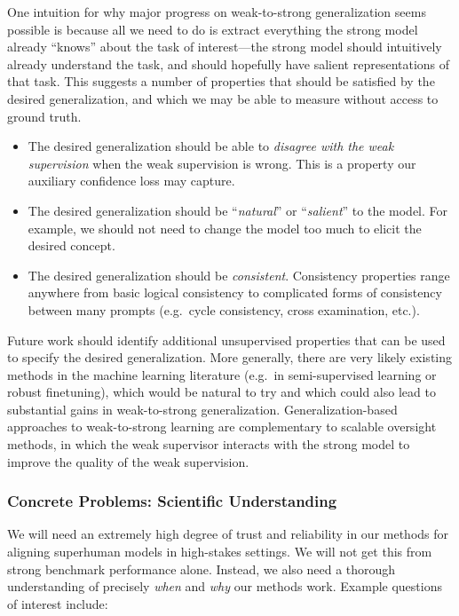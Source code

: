 One intuition for why major progress on weak-to-strong generalization seems possible is because all we need to do is extract everything the strong model already ``knows'' about the task of interest---the strong model should intuitively already understand the task, and should hopefully have salient representations of that task. This suggests a number of properties that should be satisfied by the desired generalization, and which we may be able to measure without access to ground truth.

\begin{itemize}
    \item The desired generalization should be able to \emph{disagree with the weak supervision} when the weak supervision is wrong. This is a property our auxiliary confidence loss may capture.
    \item The desired generalization should be ``\emph{natural}'' or ``\emph{salient}'' to the model. For example, we should not need to change the model too much to elicit the desired concept.
    \item The desired generalization should be \emph{consistent}. Consistency properties range anywhere from basic logical consistency to complicated forms of consistency between many prompts (e.g.~cycle consistency, cross examination, etc.).
\end{itemize}

Future work should identify additional unsupervised properties that can be used to specify the desired generalization. More generally, there are very likely existing methods in the machine learning literature (e.g.~in semi-supervised learning or robust finetuning), which would be natural to try and which could also lead to substantial gains in weak-to-strong generalization. Generalization-based approaches to weak-to-strong learning are complementary to scalable oversight methods, in which the weak supervisor interacts with the strong model to improve the quality of the weak supervision.

\subsubsection{Concrete Problems: Scientific Understanding}

We will need an extremely high degree of trust and reliability in our methods for aligning superhuman models in high-stakes settings. We will not get this from strong benchmark performance alone. Instead, we also need a thorough understanding of precisely \textit{when} and \textit{why} our methods work. Example questions of interest include:

